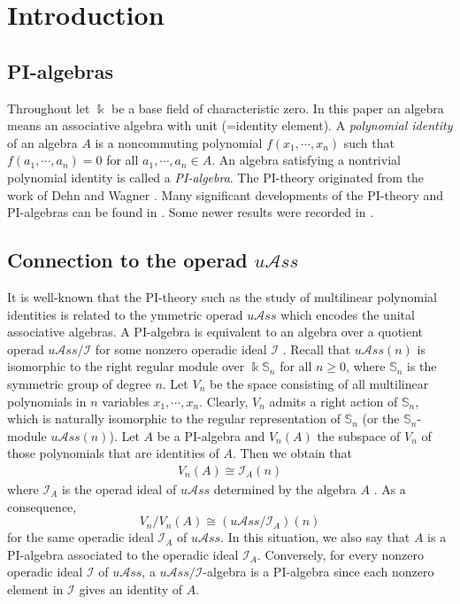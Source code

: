 \documentclass{amsart}
\theoremstyle{definition}
\theoremstyle{remark}
\numberwithin{equation}{section}
\def\S{\mathbb{S}}
\def \uas{u\mathcal{A}ss}
\def \I{\mathcal{I}}
\def \S{\mathbb{S}}
\begin{document}
\maketitle


\setcounter{section}{-1}
\section{Introduction}
\label{yysec0}

\subsection{PI-algebras}
\label{yysec0.1}
Throughout let $\Bbbk$ be a base field of characteristic zero. 
In this paper an algebra means an associative algebra with unit (=identity element). 
A \textit{polynomial identity} of an algebra $A$ is a noncommuting polynomial $f(x_1, \cdots, x_n)$ 
such that $f(a_1, \cdots, a_n)=0$ for all $a_1, \cdots, a_n\in A$. 
An algebra satisfying a nontrivial polynomial identity is called a \textit{PI-algebra}. 
The PI-theory originated from the work of Dehn \cite{De} and Wagner \cite{Wa}. 
Many significant developments of the PI-theory and PI-algebras can be found in \cite{GZ6, KR, Ka1, Ja, Pr, Ro}. 
Some newer results were recorded in \cite{AGPR, DF}.

\subsection{Connection to the operad $\uas$}
\label{yysec0.2}
It is well-known that the PI-theory such as the study of multilinear polynomial identities is related to 
the ymmetric operad $\uas$ which encodes the unital associative algebras. 
A PI-algebra is equivalent to an algebra over a quotient operad $\uas/\I$ for some nonzero operadic ideal $\I$ \cite[Lemma 2.1]{BXYZZ}. 
Recall that $\uas(n)$ is isomorphic to the right regular module over $\Bbbk\S_n$ for all $n\geq 0$, 
where $\S_n$ is the symmetric group of degree $n$. 
Let $V_n$ be the space consisting of all multilinear polynomials in $n$ variables $x_1, \cdots, x_n$. 
Clearly, $V_n$ admits a right action of $\S_n$, 
which is naturally isomorphic to the regular representation of $\S_n$ (or the $\S_n$-module $\uas(n)$). 
Let $A$ be a PI-algebra and $V_n(A)$ the subspace of $V_n$ of those polynomials that are identities of $A$. 
Then we obtain that
\begin{align*}
V_n(A)\cong \I_A(n)
\end{align*}
where $\I_A$ is the operad ideal of $\uas$ determined by the algebra $A$ \cite[Proposition 2.3]{BXYZZ}. 
As a consequence,
\begin{equation}
\label{E0.0.1}\tag{E0.0.1}
V_n/V_n(A)\cong (\uas/\I_A)(n)
\end{equation}  
for the same operadic ideal $\I_A$ of $\uas$. 
In this situation, we also say that $A$ is a PI-algebra associated to the operadic ideal $\I_A$. 
Conversely, for every nonzero operadic ideal $\I$ of $\uas$, 
a $\uas/\I$-algebra is a PI-algebra since each nonzero element in $\I$ gives an identity of $A$.   
\end{document}
